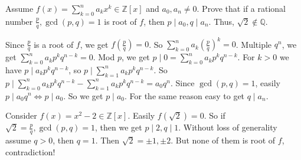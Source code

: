 \documentclass{ctexart}
\begin{document}
\begin{problem}\label{pro:p10.3}
	Assume \(f(x)=\sum_{k=0}^{n}a_k x^k \in \mathbb{Z}[x]\) and \(a_0,a_n \neq 0\).
	Prove that if a rational number \(\frac{p}{q},\gcd(p,q)=1\) is root of \(f\), then \(p \mid a_0,q \mid a_n\).
	Thus, \(\sqrt{2} \notin \mathbb{Q}\).
\end{problem}
\begin{solution}
	Since \(\frac{p}{q}\) is a root of \(f\), we get \(f(\frac{p}{q})=0\).
	So \(\sum_{k=0}^{n}a_k (\frac{p}{q})^k=0\).
	Multiple \(q^n\), we get \(\sum_{k=0}^{n}a_k p^k q^{n-k}=0\).
	Mod \(p\), we get \(p \mid 0 = \sum_{k=0}^{n}a_k p^k q^{n-k}\).
	For \(k>0\) we have \(p \mid a_k p^k q^{n-k}\), so \(p \mid \sum_{k=1}^{n}a_k p^k q^{n-k}\).
	So \(p \mid \sum_{k=0}^{n}a_k p^k q^{n-k}-\sum_{k=1}^{n}a_k p^k q^{n-k}=a_0q^n\).
	Since \(\gcd(p,q)=1\), easily \(p \mid a_0 q^n \iff p \mid a_0\).
	So we get \(p \mid a_0\).
	For the same reason easy to get \(q \mid a_n\).

	Consider \(f(x)=x^2-2 \in \mathbb{Z}[x]\). Easily \(f(\sqrt{2})=0\).
	So if \(\sqrt{2}=\frac{p}{q},\gcd(p,q)=1\), then we get \(p \mid 2,q \mid 1\).
	Without loss of generality assume \(q > 0\), then \(q=1\).
	Then \(\sqrt{2}=\pm 1 ,\pm 2\).
	But none of them is root of \(f\), contradiction!
\end{solution}
\end{document}
